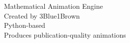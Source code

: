 \documentclass[preview]{standalone}
\begin{document}
Mathematical Animation Engine\\Created by 3Blue1Brown\\Python-based\\Produces publication-quality animations\\
\end{document}
